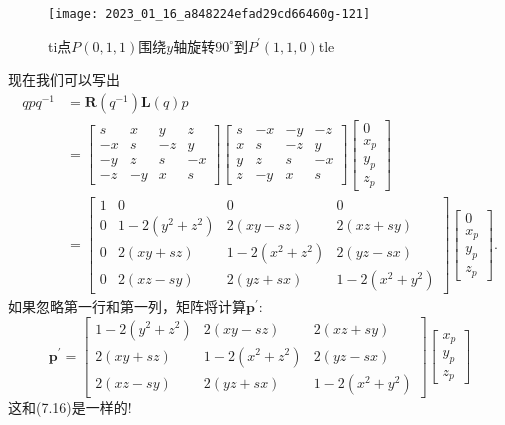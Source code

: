 \begin{figure}[h!]
    \centering
    \texttt{[image: 2023\_01\_16\_a848224efad29cd66460g-121]}
    \caption[short]{ti点$P(0,1,1)$围绕$y$轴旋转$90^{\circ}$到$P^{\prime}(1,1,0)$tle}
\end{figure}

现在我们可以写出
$$
\begin{aligned}
q p q^{-1} & =\mathbf{R}\left(q^{-1}\right) \mathbf{L}(q) p \\
& =\left[\begin{array}{cccc}
s & x & y & z \\
-x & s & -z & y \\
-y & z & s & -x \\
-z & -y & x & s
\end{array}\right]\left[\begin{array}{cccc}
s & -x & -y & -z \\
x & s & -z & y \\
y & z & s & -x \\
z & -y & x & s
\end{array}\right]\left[\begin{array}{c}
0 \\
x_{p} \\
y_{p} \\
z_{p}
\end{array}\right] \\
& =\left[\begin{array}{cccc}
1 & 0 & 0 & 0 \\
0 & 1-2\left(y^{2}+z^{2}\right) & 2(x y-s z) & 2(x z+s y) \\
0 & 2(x y+s z) & 1-2\left(x^{2}+z^{2}\right) & 2(y z-s x) \\
0 & 2(x z-s y) & 2(y z+s x) & 1-2\left(x^{2}+y^{2}\right)
\end{array}\right]\left[\begin{array}{c}
0 \\
x_{p} \\
y_{p} \\
z_{p}
\end{array}\right] .
\end{aligned}
$$
如果忽略第一行和第一列，矩阵将计算$\mathbf{p}^{\prime}$:
$$
\mathbf{p}^{\prime}=\left[\begin{array}{ccc}
1-2\left(y^{2}+z^{2}\right) & 2(x y-s z) & 2(x z+s y) \\
2(x y+s z) & 1-2\left(x^{2}+z^{2}\right) & 2(y z-s x) \\
2(x z-s y) & 2(y z+s x) & 1-2\left(x^{2}+y^{2}\right)
\end{array}\right]\left[\begin{array}{l}
x_{p} \\
y_{p} \\
z_{p}
\end{array}\right]
$$
这和(7.16)是一样的!

